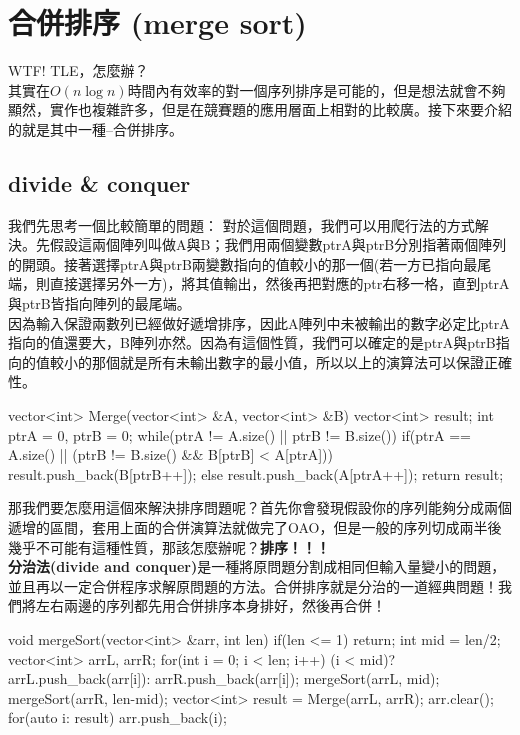 \section{合併排序 (merge sort)}
WTF! TLE，怎麼辦？\\
其實在$O(n\log n)$時間內有效率的對一個序列排序是可能的，但是想法就會不夠顯然，實作也複雜許多，但是在競賽題的應用層面上相對的比較廣。接下來要介紹的就是其中一種--合併排序。
\subsection{divide \& conquer}
我們先思考一個比較簡單的問題：
對於這個問題，我們可以用爬行法的方式解決。先假設這兩個陣列叫做A與B；我們用兩個變數ptrA與ptrB分別指著兩個陣列的開頭。接著選擇ptrA與ptrB兩變數指向的值較小的那一個(若一方已指向最尾端，則直接選擇另外一方)，將其值輸出，然後再把對應的ptr右移一格，直到ptrA與ptrB皆指向陣列的最尾端。\\
\indent 因為輸入保證兩數列已經做好遞增排序，因此A陣列中未被輸出的數字必定比ptrA指向的值還要大，B陣列亦然。因為有這個性質，我們可以確定的是ptrA與ptrB指向的值較小的那個就是所有未輸出數字的最小值，所以以上的演算法可以保證正確性。
\begin{C++}
vector<int> Merge(vector<int> &A, vector<int> &B){
    vector<int> result;
    int ptrA = 0, ptrB = 0;
    while(ptrA != A.size() || ptrB != B.size()){
        if(ptrA == A.size() || (ptrB != B.size() && B[ptrB] < A[ptrA]))
            result.push_back(B[ptrB++]);
        else result.push_back(A[ptrA++]);
    }
    return result;
}
\end{C++}
\indent\indent 那我們要怎麼用這個來解決排序問題呢？首先你會發現假設你的序列能夠分成兩個遞增的區間，套用上面的合併演算法就做完了OAO，但是一般的序列切成兩半後幾乎不可能有這種性質，那該怎麼辦呢？\textbf{排序！！！}\\
\indent\indent\textbf{分治法(divide and conquer)}是一種將原問題分割成相同但輸入量變小的問題，並且再以一定合併程序求解原問題的方法。合併排序就是分治的一道經典問題！我們將左右兩邊的序列都先用合併排序本身排好，然後再合併！\\
\begin{C++}
void mergeSort(vector<int> &arr, int len){
    if(len <= 1) return;
    int mid = len/2;
    vector<int> arrL, arrR;
    for(int i = 0; i < len; i++)
        (i < mid)? arrL.push_back(arr[i]):
                   arrR.push_back(arr[i]);
    mergeSort(arrL, mid);
    mergeSort(arrR, len-mid);
    vector<int> result = Merge(arrL, arrR);
    arr.clear();
    for(auto i: result) arr.push_back(i);
}
\end{C++}

